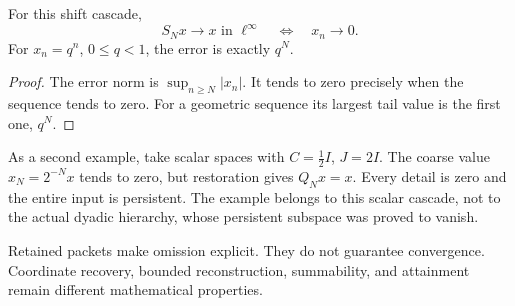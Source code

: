 \begin{proposition}\label{KS29}
For this shift cascade,
\[
 S_Nx\to x\text{ in }\ell^\infty
 \quad\Longleftrightarrow\quad x_n\to0.
\]
For \(x_n=q^n\), \(0\le q<1\), the error is exactly \(q^N\).
\end{proposition}
\begin{proof}
The error norm is \(\sup_{n\ge N}|x_n|\). It tends to zero precisely when the sequence tends to zero. For a geometric sequence its largest tail value is the first one, \(q^N\).
\end{proof}
As a second example, take scalar spaces with \(C=\tfrac12I\), \(J=2I\). The coarse value \(x_N=2^{-N}x\) tends to zero, but restoration gives \(Q_Nx=x\). Every detail is zero and the entire input is persistent. The example belongs to this scalar cascade, not to the actual dyadic hierarchy, whose persistent subspace was proved to vanish.

\begin{insight}
Retained packets make omission explicit. They do not guarantee convergence. Coordinate recovery, bounded reconstruction, summability, and attainment remain different mathematical properties.
\end{insight}
